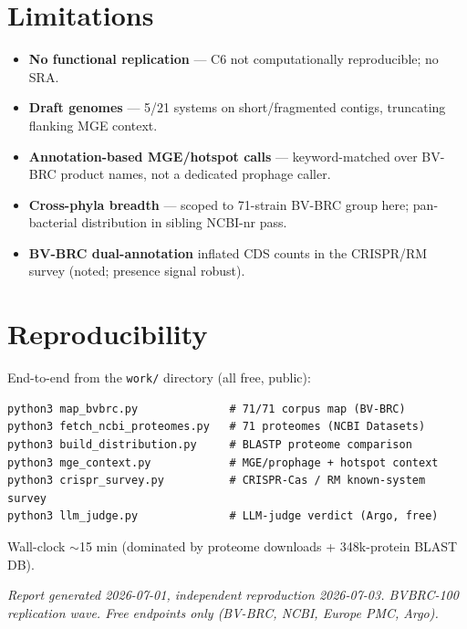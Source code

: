 \documentclass[11pt,letterpaper]{article}
\begin{document}
\section{Limitations}
\begin{itemize}
    \item \textbf{No functional replication} --- C6 not computationally reproducible; no SRA.
    \item \textbf{Draft genomes} --- 5/21 systems on short/fragmented contigs, truncating flanking MGE context.
    \item \textbf{Annotation-based MGE/hotspot calls} --- keyword-matched over BV-BRC product names, not a dedicated prophage caller.
    \item \textbf{Cross-phyla breadth} --- scoped to 71-strain BV-BRC group here; pan-bacterial distribution in sibling NCBI-nr pass.
    \item \textbf{BV-BRC dual-annotation} inflated CDS counts in the CRISPR/RM survey (noted; presence signal robust).
\end{itemize}

\section{Reproducibility}
End-to-end from the \texttt{work/} directory (all free, public):
\begin{verbatim}
python3 map_bvbrc.py              # 71/71 corpus map (BV-BRC)
python3 fetch_ncbi_proteomes.py   # 71 proteomes (NCBI Datasets)
python3 build_distribution.py     # BLASTP proteome comparison
python3 mge_context.py            # MGE/prophage + hotspot context
python3 crispr_survey.py          # CRISPR-Cas / RM known-system survey
python3 llm_judge.py              # LLM-judge verdict (Argo, free)
\end{verbatim}
Wall-clock $\sim$15 min (dominated by proteome downloads + 348k-protein BLAST DB).

\vspace{1em}
\noindent\textit{Report generated 2026-07-01, independent reproduction 2026-07-03. BVBRC-100 replication wave. Free endpoints only (BV-BRC, NCBI, Europe PMC, Argo).}
\end{document}
